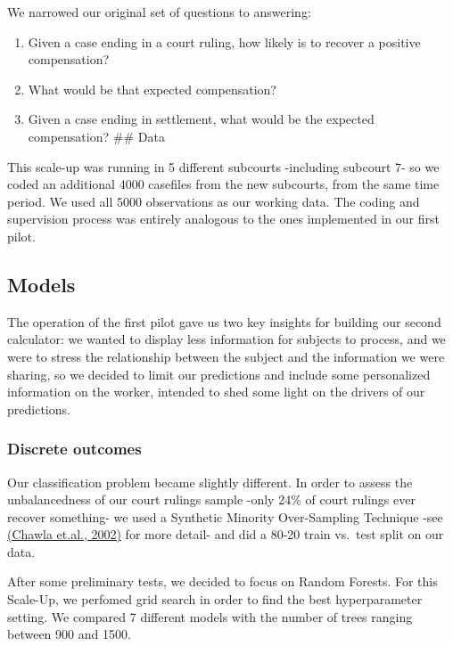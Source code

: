 \documentclass[]{article}
\begin{document}
We narrowed our original set of questions to answering:

\begin{enumerate}
\def\labelenumi{\arabic{enumi}.}
\item
  Given a case ending in a court ruling, how likely is to recover a
  positive compensation?
\item
  What would be that expected compensation?
\item
  Given a case ending in settlement, what would be the expected
  compensation? \#\# Data
\end{enumerate}

This scale-up was running in 5 different subcourts -including subcourt
7- so we coded an additional 4000 casefiles from the new subcourts, from
the same time period. We used all 5000 observations as our working data.
The coding and supervision process was entirely analogous to the ones
implemented in our first pilot.

\subsection{Models}\label{models-1}

The operation of the first pilot gave us two key insights for building
our second calculator: we wanted to display less information for
subjects to process, and we were to stress the relationship between the
subject and the information we were sharing, so we decided to limit our
predictions and include some personalized information on the worker,
intended to shed some light on the drivers of our predictions.

\subsubsection{Discrete outcomes}\label{discrete-outcomes-1}

Our classification problem became slightly different. In order to assess
the unbalancedness of our court rulings sample -only 24\% of court
rulings ever recover something- we used a Synthetic Minority
Over-Sampling Technique -see
\href{http://jair.org/media/953/live-953-2037-jair.pdf}{(Chawla et.al.,
2002)} for more detail- and did a 80-20 train vs.~test split on our
data.

After some preliminary tests, we decided to focus on Random Forests. For
this Scale-Up, we perfomed grid search in order to find the best
hyperparameter setting. We compared 7 different models with the number
of trees ranging between 900 and 1500.
\end{document}
